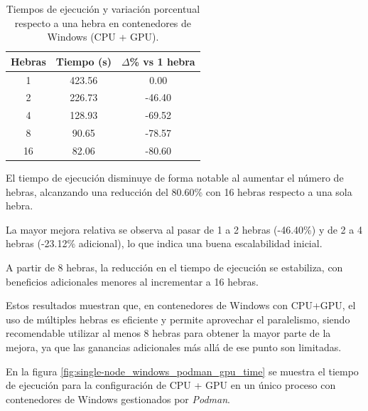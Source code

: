 \begin{table}[ht]
    \centering
    \begin{tabular}{|c|c|c|}
        \hline
        \textbf{Hebras} & \textbf{Tiempo (s)} & \textbf{$\Delta$\% vs 1 hebra} \\
        \hline
        1               & 423.56              & 0.00                           \\
        2               & 226.73              & -46.40                         \\
        4               & 128.93              & -69.52                         \\
        8               & 90.65               & -78.57                         \\
        16              & 82.06               & -80.60                         \\
        \hline
    \end{tabular}
    \caption{Tiempos de ejecución y variación porcentual respecto a una hebra en contenedores de Windows (CPU + GPU).}
    \label{tab:single-node_windows_docker_gpu}
\end{table}

El tiempo de ejecución disminuye de forma notable al aumentar el número de hebras, alcanzando una reducción del 80.60\% con 16 hebras respecto a una sola hebra.

La mayor mejora relativa se observa al pasar de 1 a 2 hebras (-46.40\%) y de 2 a 4 hebras (-23.12\% adicional), lo que indica una buena escalabilidad inicial.

A partir de 8 hebras, la reducción en el tiempo de ejecución se estabiliza, con beneficios adicionales menores al incrementar a 16 hebras.

Estos resultados muestran que, en contenedores de Windows con CPU+GPU, el uso de múltiples hebras es eficiente y permite aprovechar el paralelismo, siendo recomendable utilizar al menos 8 hebras para obtener la mayor parte de la mejora, ya que las ganancias adicionales más allá de ese punto son limitadas.

En la figura \ref{fig:single-node_windows_podman_gpu_time} se muestra el tiempo de ejecución para la configuración de CPU + GPU en un único proceso con contenedores de Windows gestionados por \textit{Podman}.

